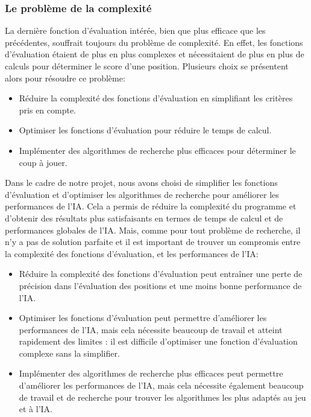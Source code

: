 \subsubsection{Le problème de la complexité}
La dernière fonction d'évaluation intérée, bien que plus efficace que les précédentes, souffrait toujours du problème
de complexité. En effet, les fonctions d'évaluation étaient de plus en plus complexes et nécessitaient de plus en plus de
calculs pour déterminer le score d'une position. Plusieurs choix se présentent alors pour résoudre ce problème:
\begin{itemize}
    \item Réduire la complexité des fonctions d'évaluation en simplifiant les critères pris en compte.
    \item Optimiser les fonctions d'évaluation pour réduire le temps de calcul.
    \item Implémenter des algorithmes de recherche plus efficaces pour déterminer le coup à jouer.
\end{itemize}
Dans le cadre de notre projet, nous avons choisi de simplifier les fonctions d'évaluation et d'optimiser les algorithmes
de recherche pour améliorer les performances de l'IA.\@
Cela a permis de réduire la complexité du programme et d'obtenir des résultats plus satisfaisants en termes de temps de 
calcul et de performances globales de l'IA.\@
Mais, comme pour tout problème de recherche, il n'y a pas de solution parfaite et il est important 
de trouver un compromis entre la complexité des fonctions d'évaluation, et les performances de l'IA:\@
\begin{itemize}
    \item Réduire la complexité des fonctions d'évaluation peut entraîner une perte de précision dans l'évaluation des positions
    et une moins bonne performance de l'IA.\@
    \item Optimiser les fonctions d'évaluation peut permettre d'améliorer les performances de l'IA, mais cela nécessite
    beaucoup de travail et atteint rapidement des limites : il est difficile d'optimiser une fonction d'évaluation
    complexe sans la simplifier.\@
    \item Implémenter des algorithmes de recherche plus efficaces peut permettre d'améliorer les performances de l'IA,
    mais cela nécessite également beaucoup de travail et de recherche pour trouver les algorithmes les plus adaptés
    au jeu et à l'IA.\@
\end{itemize}

